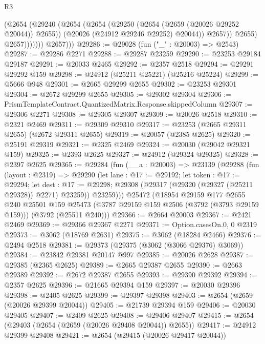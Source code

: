 \begin{lexlean}{R3}
\begin{coremodule}
                        (@2654
                          (@29240
                            (@2654
                              (@2654
                                (@29250 (@2654 (@2659 (@20026 @29252 @20044)) @2655))
                                (@20026 (@24912 @29246 @29252) @20044))
                              @2657))
                          @2655)
                        @2657)))))))
          @2657)))
@29286 := @29028 (fun ("_" : @20003) => @2543)
@29287 := @29286 @2271
@29288 := @29287 @23259
@29290 := @23253 @29184 @29187
@29291 := @20033 @2465
@29292 := @2357 @2518
@29294 := @29291 @29292 @159
@29298 := @24912 (@25211 @25221) (@25216 @25224)
@29299 := @5666 @948
@29301 := @2665 @29299 @2655
@29302 := @23253 @29301
@29304 := @2672 @29299 @2655
@29305 := @29302 @29304
@29306 := PrismTemplateContract.QuantizedMatrix.Response.skippedColumn
@29307 := @29306 @2271
@29308 := @29305 @29307
@29309 := @20026 @2518
@29310 := @2321 @2469
@29311 := @29309 @29310
@29317 := @23253 (@2665 @29311 @2655) (@2672 @29311 @2655)
@29319 := @20057 (@2385 @2625)
@29320 := @25191 @29319
@29321 := @2325 @2469
@29324 := @20030 (@29042 @29321 @159)
@29325 := @2393 @2625
@29327 := @24912 (@29324 @29325)
@29328 := @2397 @2625
@29365 := @29284
    (fun (__a : @20003) =>
    @23139
      (@29288
        (fun (layout : @2319) =>
        @29290
          (let lane : @17 := @29192;
          let token : @17 := @29294;
          let dest : @17 := @29298; @29308 (@29317 (@29320 (@29327 (@25211 @29328)) @2271) @23259))
          @23259)))
    @25472
    (@18954
      @29159
      @177
      @2655
      @240
      @25501
      @159
      @25473
      (@3787 @29159 @159 @2506 (@3792 (@3793 @29159 @159)))
      (@3792 (@25511 @240)))
@29366 := @2664 @20003
@29367 := @2421 @2469
@29369 := @29366 @29367 @2271
@29371 := Option.casesOn.{0, 0} @2319
@29373 := @3062 (@18769 @2631)
@29375 := @3062 (@18284 @2466)
@29376 := @2494 @2518
@29381 := @29373 (@29375 (@3062 (@3066 @29376) @3069))
@29384 := @23842 @29381 @20147 @997
@29385 := @20026 @2628
@29387 := @29385 (@2365 @2625)
@29389 := @2665 @29387 @2655
@29390 := @2663 @29389
@29392 := @2672 @29387 @2655
@29393 := @29390 @29392
@29394 := @2357 @2625
@29396 := @21665 @29394 @159
@29397 := @20030 @29396
@29398 := @2405 @2625
@29399 := @29397 @29398
@29403 := @2654 (@2659 (@20026 @29399 @20044))
@29405 := @21739 @29394 @159
@29406 := @20030 @29405
@29407 := @2409 @2625
@29408 := @29406 @29407
@29415 := @2654 (@29403 (@2654 (@2659 (@20026 @29408 @20044)) @2655))
@29417 := @24912 @29399 @29408
@29421 := @2654 (@29415 (@20026 @29417 @20044))

\end{coremodule}
\end{lexlean}
